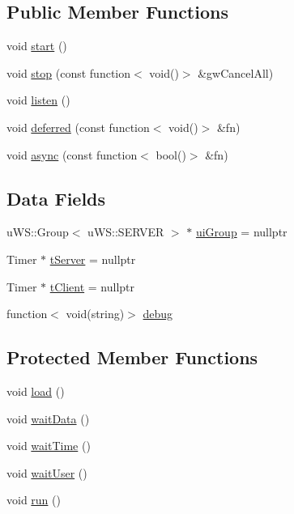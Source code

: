\subsection*{Public Member Functions}
\begin{DoxyCompactItemize}
\item 
void \hyperlink{class_k_1_1_e_v_a60de64d75454385b23995437f1d72669}{start} ()
\item 
void \hyperlink{class_k_1_1_e_v_a9b9c0a09ee1c1f71eed99acb7911d9af}{stop} (const function$<$ void()$>$ \&gw\+Cancel\+All)
\item 
void \hyperlink{class_k_1_1_e_v_a458bbe4cf81360301586b2e62a7f9dd2}{listen} ()
\item 
void \hyperlink{class_k_1_1_e_v_ab2cd59fade125e3516d94a02ce3b8579}{deferred} (const function$<$ void()$>$ \&fn)
\item 
void \hyperlink{class_k_1_1_e_v_aded8c7be8e73860a133e2f261c53b071}{async} (const function$<$ bool()$>$ \&fn)
\end{DoxyCompactItemize}
\subsection*{Data Fields}
\begin{DoxyCompactItemize}
\item 
u\+W\+S\+::\+Group$<$ u\+W\+S\+::\+S\+E\+R\+V\+ER $>$ $\ast$ \hyperlink{class_k_1_1_e_v_a9224c71ab6f6621adf6069f9c9adc751}{ui\+Group} = nullptr
\item 
Timer $\ast$ \hyperlink{class_k_1_1_e_v_a3528df0e9a2cf9a83ad1a92b6a79a5d4}{t\+Server} = nullptr
\item 
Timer $\ast$ \hyperlink{class_k_1_1_e_v_ae69ff430a805e08decf0feee8938b9b7}{t\+Client} = nullptr
\item 
function$<$ void(string)$>$ \hyperlink{class_k_1_1_e_v_ab04bc4fb6f845a182c6ee0a32c67550c}{debug}
\end{DoxyCompactItemize}
\subsection*{Protected Member Functions}
\begin{DoxyCompactItemize}
\item 
void \hyperlink{class_k_1_1_e_v_a78f61ac2dd03bcba8e09ca20cd7d68e3}{load} ()
\item 
void \hyperlink{class_k_1_1_e_v_aa9a0f090ee360e2a9f967200d30f4a22}{wait\+Data} ()
\item 
void \hyperlink{class_k_1_1_e_v_ade4c89163dbda531e71c8c75eb2868b4}{wait\+Time} ()
\item 
void \hyperlink{class_k_1_1_e_v_aa3f7b56799f5915cfbc902f6426c2bb2}{wait\+User} ()
\item 
void \hyperlink{class_k_1_1_e_v_a13a43e6d814de94978c515cb084873b1}{run} ()
\end{DoxyCompactItemize}
